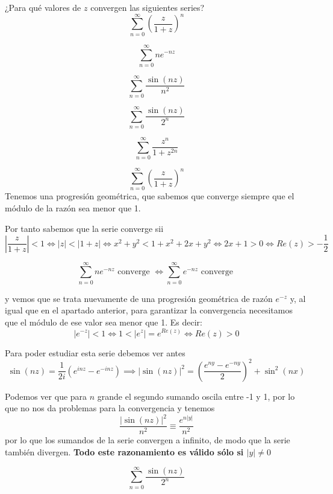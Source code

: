 \begin{problem}[18]
¿Para qué valores de $z$ convergen las siguientes series?
\ppart
\[\sum_{n=0}^{\infty} \left( \frac{z}{1+z}\right)^n\]

\ppart
\[\sum_{n=0}^{\infty} ne^{-nz}\]

\ppart
\[\sum_{n=0}^{\infty} \frac{\sin(nz)}{n^2}\]

\ppart
\[\sum_{n=0}^{\infty} \frac{\sin(nz)}{2^n}\]

\ppart
\[\sum_{n=0}^{\infty} \frac{z^n}{1+z^{2n}}\]

\solution

\spart
\[\sum_{n=0}^{\infty} \left( \frac{z}{1+z}\right)^n\]
Tenemos una progresión geométrica, que sabemos que converge siempre que el módulo de la razón sea menor que 1.

Por tanto sabemos que la serie converge sii
\[\left| \frac{z}{1+z}\right| < 1 \iff |z| < |1+z| \iff x^2+y^2 < 1+x^2+2x+y^2 \iff 2x+1 > 0 \iff Re(z)>-\frac{1}{2}\]

\spart
\[\sum_{n=0}^{\infty} ne^{-nz} \text{ converge } \iff \sum_{n=0}^{\infty} e^{-nz}\text{ converge }\]

y vemos que se trata nuevamente de una progresión geométrica de razón $e^{-z}$ y, al igual que en el apartado anterior, para garantizar la convergencia necesitamos que el módulo de ese valor sea menor que 1. Es decir:
\[|e^{-z}| < 1 \iff 1 < |e^z|=e^{Re(z)} \iff Re(z) > 0\]

\spart
Para poder estudiar esta serie debemos ver antes
\[\sin(nz)=\frac{1}{2i}\left( e^{inz}-e^{-inz}\right) \implies |\sin(nz)|^2 = \left( \frac{e^{ny}-e^{-ny}}{2}\right)^2+\sin^2(nx)\]

Podemos ver que para $n$ grande el segundo sumando oscila entre -1 y 1, por lo que no nos da problemas para la convergencia y tenemos
\[\frac{|\sin(nz)|^2}{n^2} \equiv \frac{e^{n|y|}}{n^2}\]
por lo que los sumandos de la serie convergen a infinito, de modo que la serie también divergen. \textbf{Todo este razonamiento es válido sólo si $|y|\neq 0$}


\spart
\[\sum_{n=0}^{\infty} \frac{\sin(nz)}{2^n}\]


\end{problem}

